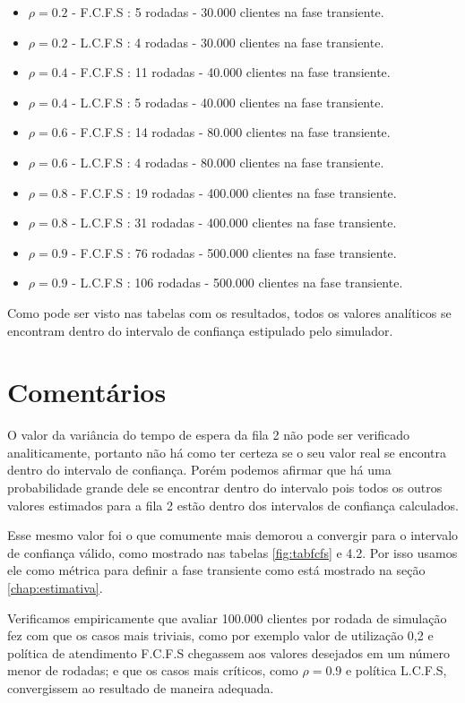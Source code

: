 \begin{itemize}
  \item $\rho=0.2$ - F.C.F.S : 5 rodadas - 30.000 clientes na fase transiente.
  \item $\rho=0.2$ - L.C.F.S : 4 rodadas - 30.000 clientes na fase transiente.
  \item $\rho=0.4$ - F.C.F.S : 11 rodadas - 40.000 clientes na fase transiente.
  \item $\rho=0.4$ - L.C.F.S : 5 rodadas - 40.000 clientes na fase transiente.
  \item $\rho=0.6$ - F.C.F.S : 14 rodadas - 80.000 clientes na fase transiente.
  \item $\rho=0.6$ - L.C.F.S : 4 rodadas - 80.000 clientes na fase transiente.
  \item $\rho=0.8$ - F.C.F.S : 19 rodadas - 400.000 clientes na fase transiente.
  \item $\rho=0.8$ - L.C.F.S : 31 rodadas - 400.000 clientes na fase transiente.
  \item $\rho=0.9$ - F.C.F.S : 76 rodadas - 500.000 clientes na fase transiente.
  \item $\rho=0.9$ - L.C.F.S : 106 rodadas - 500.000 clientes na fase transiente.
\end{itemize}

Como pode ser visto nas tabelas com os resultados, todos os valores analíticos se encontram dentro do intervalo de confiança estipulado pelo simulador.

\section{Comentários}
\label{sec:coment}

O valor da variância do tempo de espera da fila 2 não pode ser verificado analiticamente, portanto não há como ter certeza se o seu valor real se encontra dentro do intervalo de confiança. Porém podemos afirmar que há uma probabilidade grande dele se encontrar dentro do intervalo pois todos os outros valores estimados para a fila 2 estão dentro dos  intervalos de confiança calculados.

Esse mesmo valor foi o que comumente mais demorou a convergir para o intervalo de confiança válido, como mostrado nas tabelas \ref{fig:tabfcfs} e 4.2. Por isso usamos ele como métrica para definir a fase transiente como está mostrado na seção \ref{chap:estimativa}.

Verificamos empiricamente que avaliar 100.000 clientes por rodada de simulação fez com que os casos mais triviais, como por exemplo valor de utilização 0,2 e política de atendimento F.C.F.S chegassem aos valores desejados em um número menor de rodadas; e que os casos mais críticos, como $\rho=0.9$ e política L.C.F.S, convergissem ao resultado de maneira adequada.

